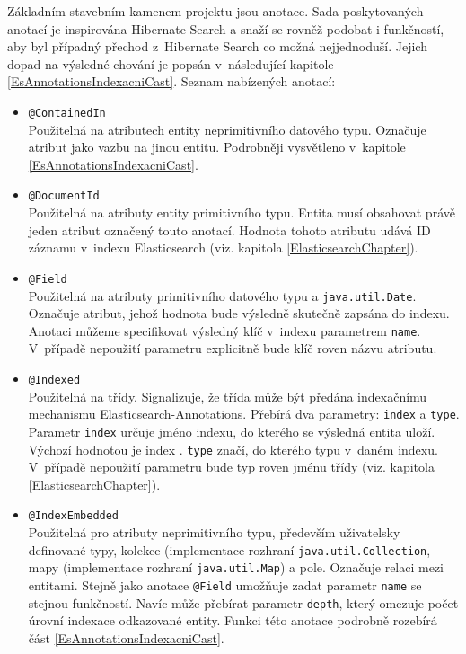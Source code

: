 \documentclass[11pt,oneside]{fithesis2}
\begin{document}
Základním stavebním kamenem projektu jsou anotace. Sada poskytovaných anotací je inspirována Hibernate Search a snaží se rovněž podobat i funkčností, aby byl případný přechod z~Hibernate Search co možná nejjednoduší. Jejich dopad na výsledné chování je popsán v~následující kapitole \ref{EsAnnotationsIndexacniCast}. Seznam nabízených anotací:
\begin{itemize}
	\item \texttt{@ContainedIn} \\
	Použitelná na atributech entity neprimitivního datového typu. Označuje atribut jako vazbu na jinou entitu. Podrobněji vysvětleno v~kapitole \ref{EsAnnotationsIndexacniCast}.

	\item \texttt{@DocumentId} \\
	Použitelná na atributy entity primitivního typu. Entita musí obsahovat právě jeden atribut označený touto anotací. Hodnota tohoto atributu udává ID záznamu v~indexu Elasticsearch (viz. kapitola \ref{ElasticsearchChapter}).

	\item \texttt{@Field} \\
	Použitelná na atributy primitivního datového typu a \texttt{java.util.Date}. Označuje atribut, jehož hodnota bude výsledně skutečně zapsána do indexu. Anotaci můžeme specifikovat výsledný klíč v~indexu parametrem \texttt{name}. V~případě nepoužití parametru explicitně bude klíč roven názvu atributu.

	\item \texttt{@Indexed} \\
	Použitelná na třídy. Signalizuje, že třída může být předána indexačnímu mechanismu Elasticsearch-Annotations. Přebírá dva parametry: \texttt{index} a \texttt{type}. Parametr \texttt{index} určuje jméno indexu, do kterého se výsledná entita uloží. Výchozí hodnotou je 	index . \texttt{type} značí, do kterého typu v~daném indexu. V~případě nepoužití parametru bude typ roven jménu třídy (viz. kapitola \ref{ElasticsearchChapter}).

	\item \texttt{@IndexEmbedded} \\
	Použitelná pro atributy neprimitivního typu, především uživatelsky definované typy, kolekce (implementace rozhraní \texttt{java.util.Collection}, mapy (implementace rozhraní \texttt{java.util.Map}) a pole. Označuje relaci mezi entitami. Stejně jako anotace \texttt{@Field} umožňuje zadat parametr \texttt{name} se stejnou funkčností. Navíc může přebírat parametr \texttt{depth}, který omezuje počet úrovní indexace odkazované entity. Funkci této anotace podrobně rozebírá část \ref{EsAnnotationsIndexacniCast}.
\end{itemize}
\end{document}
